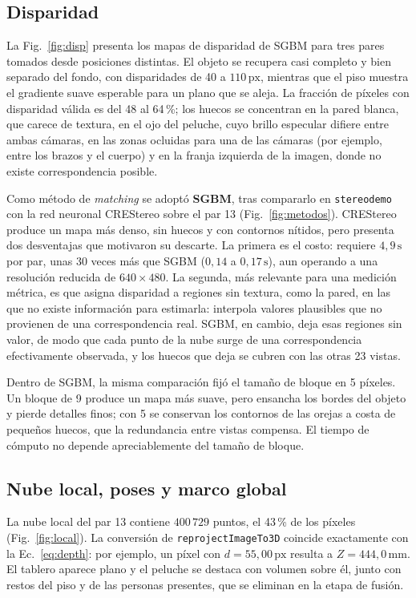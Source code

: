 \documentclass[10pt,a4paper,twocolumn]{article}
\newcommand{\px}{\,\mathrm{px}}
\newcommand{\mm}{\,\mathrm{mm}}
\newcommand{\code}[1]{\texttt{#1}}
\begin{document}
\subsection{Disparidad}
\label{sec:res-disp}

La Fig.~\ref{fig:disp} presenta los mapas de disparidad de SGBM para tres pares tomados desde posiciones distintas. El objeto se recupera casi completo y bien separado del fondo, con disparidades de 40 a $110\px$, mientras que el piso muestra el gradiente suave esperable para un plano que se aleja. La fracción de píxeles con disparidad válida es del 48 al 64\,\%; los huecos se concentran en la pared blanca, que carece de textura, en el ojo del peluche, cuyo brillo especular difiere entre ambas cámaras, en las zonas ocluidas para una de las cámaras (por ejemplo, entre los brazos y el cuerpo) y en la franja izquierda de la imagen, donde no existe correspondencia posible.

Como método de \emph{matching} se adoptó \textbf{SGBM}, tras compararlo en \code{stereodemo} con la red neuronal CREStereo sobre el par 13 (Fig.~\ref{fig:metodos}). CREStereo produce un mapa más denso, sin huecos y con contornos nítidos, pero presenta dos desventajas que motivaron su descarte. La primera es el costo: requiere $4{,}9\,\mathrm{s}$ por par, unas 30 veces más que SGBM ($0{,}14$ a $0{,}17\,\mathrm{s}$), aun operando a una resolución reducida de $640\times480$. La segunda, más relevante para una medición métrica, es que asigna disparidad a regiones sin textura, como la pared, en las que no existe información para estimarla: interpola valores plausibles que no provienen de una correspondencia real. SGBM, en cambio, deja esas regiones sin valor, de modo que cada punto de la nube surge de una correspondencia efectivamente observada, y los huecos que deja se cubren con las otras 23 vistas.

Dentro de SGBM, la misma comparación fijó el tamaño de bloque en 5 píxeles. Un bloque de 9 produce un mapa más suave, pero ensancha los bordes del objeto y pierde detalles finos; con 5 se conservan los contornos de las orejas a costa de pequeños huecos, que la redundancia entre vistas compensa. El tiempo de cómputo no depende apreciablemente del tamaño de bloque.

\subsection{Nube local, poses y marco global}
\label{sec:res-pose}

La nube local del par 13 contiene $400\,729$ puntos, el 43\,\% de los píxeles (Fig.~\ref{fig:local}). La conversión de \code{reprojectImageTo3D} coincide exactamente con la Ec.~\eqref{eq:depth}: por ejemplo, un píxel con $d=55{,}00\px$ resulta a $Z=444{,}0\mm$. El tablero aparece plano y el peluche se destaca con volumen sobre él, junto con restos del piso y de las personas presentes, que se eliminan en la etapa de fusión.
\end{document}
